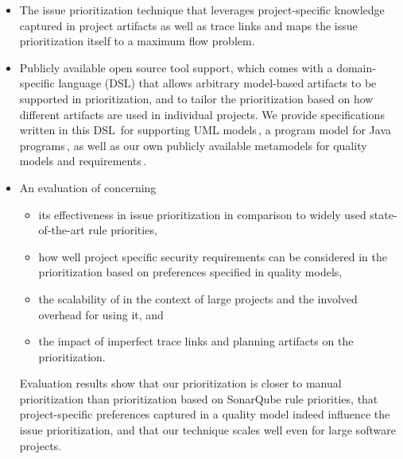 \begin{itemize}
    \item The \appr{} issue prioritization technique that leverages project-specific knowledge captured in project artifacts as well as trace links and maps the issue prioritization itself to a maximum flow problem.


    \item Publicly available open source tool support, which comes with a domain-specific language (DSL) that allows arbitrary model-based artifacts to be supported in prioritization, and to tailor the prioritization based on how different artifacts are used in individual projects. We provide specifications written in this DSL\,\cite{fowler2010domain,dsl}
    for supporting UML models\,\cite{uml}, a program model for Java programs\,\cite{peldszus2016continuous,Peldszus2022}, as well as our own publicly available metamodels for quality models and requirements\,\cite{replication}.

    \item An evaluation of \appr{} concerning
    \begin{itemize}
        \item its effectiveness in issue prioritization in comparison to widely used state-of-the-art rule priorities,
        \item how well project specific security requirements can be considered in the prioritization based on preferences specified in quality models,
        \item the scalability of \appr{} in the context of large projects and the involved overhead for using it, and
        \item the impact of imperfect trace links and planning artifacts on the prioritization.
    \end{itemize}

    Evaluation results show that our prioritization is closer to manual prioritization than prioritization based on SonarQube rule priorities, that project-specific preferences captured in a quality model indeed influence the issue prioritization, and that our technique scales well even for large software projects.
\end{itemize}

